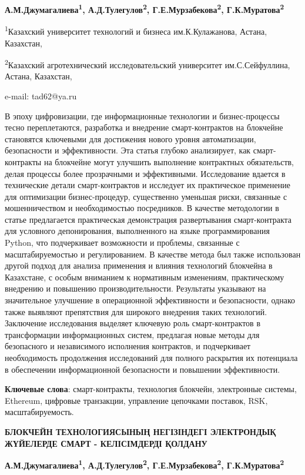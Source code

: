 \textbf{А.М.Джумагалиева\textsuperscript{1},
А.Д.Тулегулов\textsuperscript{2}, Г.Е.Мурзабекова\textsuperscript{2},
Г.К.Муратова\textsuperscript{2}}

\textsuperscript{1}Казахский университет технологий и бизнеса
им.К.Кулажанова, Астана, Казахстан,

\textsuperscript{2}Казахский агротехнический исследовательский
университет им.С.Сейфуллина, Астана, Казахстан,

e-mail: tad62@ya.ru

В эпоху цифровизации, где информационные технологии и бизнес-процессы
тесно переплетаются, разработка и внедрение смарт-контрактов на
блокчейне становятся ключевыми для достижения нового уровня
автоматизации, безопасности и эффективности. Эта статья глубоко
анализирует, как смарт-контракты на блокчейне могут улучшить выполнение
контрактных обязательств, делая процессы более прозрачными и
эффективными. Исследование вдается в технические детали смарт-контрактов
и исследует их практическое применение для оптимизации бизнес-процедур,
существенно уменьшая риски, связанные с мошенничеством и необходимостью
посредников. В качестве методологии в статье предлагается практическая
демонстрация развертывания смарт-контракта для условного депонирования,
выполненного на языке программирования Python, что подчеркивает
возможности и проблемы, связанные с масштабируемостью и регулированием.
В качестве метода был также использован другой подход для анализа
применения и влияния технологий блокчейна в Казахстане, с особым
вниманием к нормативным изменениям, практическому внедрению и повышению
производительности. Результаты указывают на значительное улучшение в
операционной эффективности и безопасности, однако также выявляют
препятствия для широкого внедрения таких технологий. Заключение
исследования выделяет ключевую роль смарт-контрактов в трансформации
информационных систем, предлагая новые методы для безопасного и
независимого исполнения контрактов, и подчеркивает необходимость
продолжения исследований для полного раскрытия их потенциала в
обеспечении информационной безопасности и повышении эффективности.

\textbf{Ключевые слова}: смарт-контракты, технология блокчейн,
электронные системы, Ethereum, цифровые транзакции, управление цепочками
поставок, RSK, масштабируемость.

\textbf{БЛОКЧЕЙН ТЕХНОЛОГИЯСЫНЫҢ НЕГІЗІНДЕГІ ЭЛЕКТРОНДЫҚ ЖҮЙЕЛЕРДЕ СМАРТ
- КЕЛІСІМДЕРДІ ҚОЛДАНУ}

\textbf{А.М.Джумагалиева\textsuperscript{1},
А.Д.Тулегулов\textsuperscript{2}, Г.Е.Мурзабекова\textsuperscript{2},
Г.К.Муратова\textsuperscript{2}}

